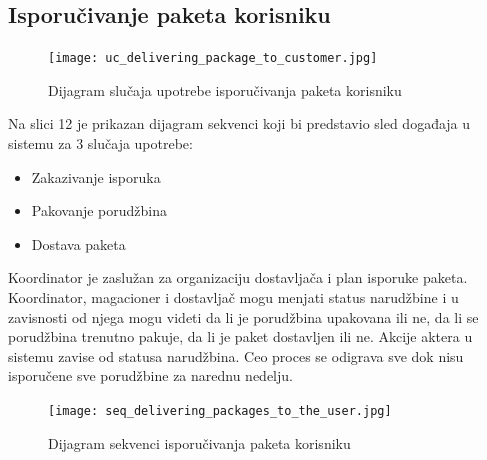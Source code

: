\subsection{Isporučivanje paketa korisniku}
\begin{figure}[H]
	\begin{center}
		\texttt{[image: uc\_delivering\_package\_to\_customer.jpg]}
	\end{center}
    \caption{Dijagram slučaja upotrebe isporučivanja paketa korisniku}
\end{figure}

Na slici 12 je prikazan dijagram sekvenci koji bi predstavio sled događaja u sistemu za 3 slučaja upotrebe: 
\begin{itemize}
	\item{Zakazivanje isporuka}
	\item{Pakovanje porudžbina }
	\item{Dostava paketa}
\end{itemize}

Koordinator je zaslužan za organizaciju dostavljača i plan isporuke paketa. Koordinator, magacioner i dostavljač mogu menjati status narudžbine i u zavisnosti od njega mogu videti da li je porudžbina upakovana ili ne, da li se porudžbina trenutno pakuje, da li je paket dostavljen ili ne. Akcije aktera u sistemu zavise od statusa narudžbina. Ceo proces se odigrava sve dok nisu isporučene sve porudžbine za narednu nedelju.


\begin{figure}[H]
	\begin{center}
		\texttt{[image: seq\_delivering\_packages\_to\_the\_user.jpg]}
	\end{center}
    \caption{Dijagram sekvenci isporučivanja paketa korisniku}
\end{figure}


